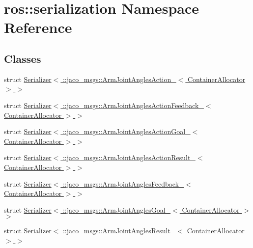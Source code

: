 \hypertarget{namespaceros_1_1serialization}{}\section{ros\+:\+:serialization Namespace Reference}
\label{namespaceros_1_1serialization}
\subsection*{Classes}
\begin{DoxyCompactItemize}
\item 
struct \hyperlink{structros_1_1serialization_1_1Serializer_3_01_1_1jaco__msgs_1_1ArmJointAnglesAction___3_01ContainerAllocator_01_4_01_4}{Serializer$<$ \+::jaco\+\_\+msgs\+::\+Arm\+Joint\+Angles\+Action\+\_\+$<$ Container\+Allocator $>$ $>$}
\item 
struct \hyperlink{structros_1_1serialization_1_1Serializer_3_01_1_1jaco__msgs_1_1ArmJointAnglesActionFeedback___3_01ContainerAllocator_01_4_01_4}{Serializer$<$ \+::jaco\+\_\+msgs\+::\+Arm\+Joint\+Angles\+Action\+Feedback\+\_\+$<$ Container\+Allocator $>$ $>$}
\item 
struct \hyperlink{structros_1_1serialization_1_1Serializer_3_01_1_1jaco__msgs_1_1ArmJointAnglesActionGoal___3_01ContainerAllocator_01_4_01_4}{Serializer$<$ \+::jaco\+\_\+msgs\+::\+Arm\+Joint\+Angles\+Action\+Goal\+\_\+$<$ Container\+Allocator $>$ $>$}
\item 
struct \hyperlink{structros_1_1serialization_1_1Serializer_3_01_1_1jaco__msgs_1_1ArmJointAnglesActionResult___3_01ContainerAllocator_01_4_01_4}{Serializer$<$ \+::jaco\+\_\+msgs\+::\+Arm\+Joint\+Angles\+Action\+Result\+\_\+$<$ Container\+Allocator $>$ $>$}
\item 
struct \hyperlink{structros_1_1serialization_1_1Serializer_3_01_1_1jaco__msgs_1_1ArmJointAnglesFeedback___3_01ContainerAllocator_01_4_01_4}{Serializer$<$ \+::jaco\+\_\+msgs\+::\+Arm\+Joint\+Angles\+Feedback\+\_\+$<$ Container\+Allocator $>$ $>$}
\item 
struct \hyperlink{structros_1_1serialization_1_1Serializer_3_01_1_1jaco__msgs_1_1ArmJointAnglesGoal___3_01ContainerAllocator_01_4_01_4}{Serializer$<$ \+::jaco\+\_\+msgs\+::\+Arm\+Joint\+Angles\+Goal\+\_\+$<$ Container\+Allocator $>$ $>$}
\item 
struct \hyperlink{structros_1_1serialization_1_1Serializer_3_01_1_1jaco__msgs_1_1ArmJointAnglesResult___3_01ContainerAllocator_01_4_01_4}{Serializer$<$ \+::jaco\+\_\+msgs\+::\+Arm\+Joint\+Angles\+Result\+\_\+$<$ Container\+Allocator $>$ $>$}

\end{DoxyCompactItemize}
